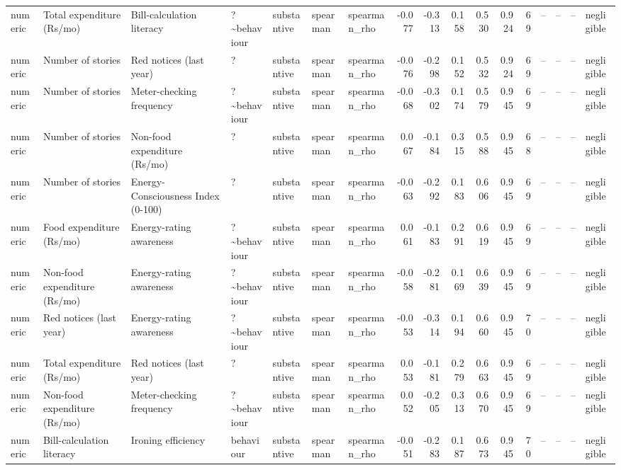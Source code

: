 \begin{table}
\begin{tabular}{lllllllrrrrrrrrrl}
numeric & Total expenditure (Rs/mo) & Bill-calculation literacy & ?\textasciitilde behaviour & substantive & spearman & spearman\_rho & -0.077 & -0.313 & 0.158 & 0.530 & 0.924 & 69 & -- & -- & -- & negligible \\
numeric & Number of stories & Red notices (last year) & ? & substantive & spearman & spearman\_rho & -0.076 & -0.298 & 0.152 & 0.532 & 0.924 & 69 & -- & -- & -- & negligible \\
numeric & Number of stories & Meter-checking frequency & ?\textasciitilde behaviour & substantive & spearman & spearman\_rho & -0.068 & -0.302 & 0.174 & 0.579 & 0.945 & 69 & -- & -- & -- & negligible \\
numeric & Number of stories & Non-food expenditure (Rs/mo) & ? & substantive & spearman & spearman\_rho & 0.067 & -0.184 & 0.315 & 0.588 & 0.945 & 68 & -- & -- & -- & negligible \\
numeric & Number of stories & Energy-Consciousness Index (0-100) & ? & substantive & spearman & spearman\_rho & -0.063 & -0.292 & 0.183 & 0.606 & 0.945 & 69 & -- & -- & -- & negligible \\
numeric & Food expenditure (Rs/mo) & Energy-rating awareness & ?\textasciitilde behaviour & substantive & spearman & spearman\_rho & 0.061 & -0.183 & 0.291 & 0.619 & 0.945 & 69 & -- & -- & -- & negligible \\
numeric & Non-food expenditure (Rs/mo) & Energy-rating awareness & ?\textasciitilde behaviour & substantive & spearman & spearman\_rho & -0.058 & -0.281 & 0.169 & 0.639 & 0.945 & 69 & -- & -- & -- & negligible \\
numeric & Red notices (last year) & Energy-rating awareness & ?\textasciitilde behaviour & substantive & spearman & spearman\_rho & -0.053 & -0.314 & 0.194 & 0.660 & 0.945 & 70 & -- & -- & -- & negligible \\
numeric & Total expenditure (Rs/mo) & Red notices (last year) & ? & substantive & spearman & spearman\_rho & 0.053 & -0.181 & 0.279 & 0.663 & 0.945 & 69 & -- & -- & -- & negligible \\
numeric & Non-food expenditure (Rs/mo) & Meter-checking frequency & ?\textasciitilde behaviour & substantive & spearman & spearman\_rho & 0.052 & -0.205 & 0.313 & 0.670 & 0.945 & 69 & -- & -- & -- & negligible \\
numeric & Bill-calculation literacy & Ironing efficiency & behaviour & substantive & spearman & spearman\_rho & -0.051 & -0.283 & 0.187 & 0.673 & 0.945 & 70 & -- & -- & -- & negligible \\

\end{tabular}
\end{table}
